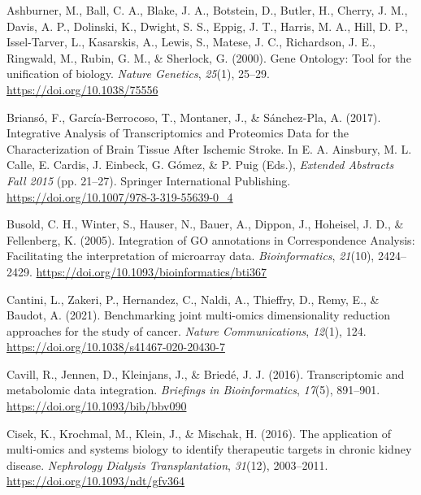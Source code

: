 \documentclass[a4paper, nobind]{templates/ociamthesis}
\newlength{\cslhangindent}
\newenvironment{CSLReferences}[2] %
 {%
  \setlength{\parindent}{0pt}
  \ifodd #1
  \let\oldpar\par
  \def\par{\hangindent=\cslhangindent\oldpar}
  \fi
  \setlength{\parskip}{1mm}
  \setlength{\baselineskip}{6mm}
 }%
 {}
\begin{document}

\hypertarget{refs}{}
\begin{CSLReferences}{1}{0}
\leavevmode{}%
Ashburner, M., Ball, C. A., Blake, J. A., Botstein, D., Butler, H., Cherry, J. M., Davis, A. P., Dolinski, K., Dwight, S. S., Eppig, J. T., Harris, M. A., Hill, D. P., Issel-Tarver, L., Kasarskis, A., Lewis, S., Matese, J. C., Richardson, J. E., Ringwald, M., Rubin, G. M., \& Sherlock, G. (2000). Gene {Ontology}: Tool for the unification of biology. \emph{Nature Genetics}, \emph{25}(1), 25--29. \url{https://doi.org/10.1038/75556}

\leavevmode{}%
Briansó, F., García-Berrocoso, T., Montaner, J., \& Sánchez-Pla, A. (2017). Integrative {Analysis} of {Transcriptomics} and {Proteomics} {Data} for the {Characterization} of {Brain} {Tissue} {After} {Ischemic} {Stroke}. In E. A. Ainsbury, M. L. Calle, E. Cardis, J. Einbeck, G. Gómez, \& P. Puig (Eds.), \emph{Extended {Abstracts} {Fall} 2015} (pp. 21--27). Springer International Publishing. \url{https://doi.org/10.1007/978-3-319-55639-0_4}

\leavevmode{}%
Busold, C. H., Winter, S., Hauser, N., Bauer, A., Dippon, J., Hoheisel, J. D., \& Fellenberg, K. (2005). Integration of {GO} annotations in {Correspondence} {Analysis}: Facilitating the interpretation of microarray data. \emph{Bioinformatics}, \emph{21}(10), 2424--2429. \url{https://doi.org/10.1093/bioinformatics/bti367}

\leavevmode{}%
Cantini, L., Zakeri, P., Hernandez, C., Naldi, A., Thieffry, D., Remy, E., \& Baudot, A. (2021). Benchmarking joint multi-omics dimensionality reduction approaches for the study of cancer. \emph{Nature Communications}, \emph{12}(1), 124. \url{https://doi.org/10.1038/s41467-020-20430-7}

\leavevmode{}%
Cavill, R., Jennen, D., Kleinjans, J., \& Briedé, J. J. (2016). Transcriptomic and metabolomic data integration. \emph{Briefings in Bioinformatics}, \emph{17}(5), 891--901. \url{https://doi.org/10.1093/bib/bbv090}

\leavevmode{}%
Cisek, K., Krochmal, M., Klein, J., \& Mischak, H. (2016). The application of multi-omics and systems biology to identify therapeutic targets in chronic kidney disease. \emph{Nephrology Dialysis Transplantation}, \emph{31}(12), 2003--2011. \url{https://doi.org/10.1093/ndt/gfv364}


\end{CSLReferences}
\end{document}
